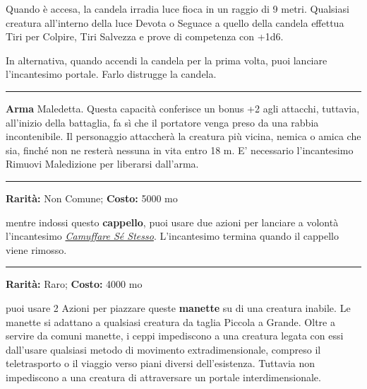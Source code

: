 \begin{multicols}{2}
Quando è accesa, la candela irradia luce fioca in un raggio di 9 metri. Qualsiasi creatura all'interno della luce Devota o Seguace a quello della candela effettua Tiri per Colpire, Tiri Salvezza e prove di competenza con +1d6.

In alternativa, quando accendi la candela per la prima volta, puoi lanciare l'incantesimo portale. Farlo distrugge la candela.

\smallskip\noindent\rule{\linewidth}{2pt}  \hypertarget{Caos}{}\medskip{}\noindent\label{Caos}

\textbf{Arma} Maledetta. Questa capacità conferisce un bonus +2 agli attacchi, tuttavia, all'inizio della battaglia, fa sì che il portatore venga preso da una rabbia incontenibile. Il personaggio attaccherà la creatura più vicina, nemica o amica che sia, finché non ne resterà nessuna in vita entro 18 m. E' necessario l'incantesimo Rimuovi Maledizione per liberarsi dall'arma.

\smallskip\noindent\rule{\linewidth}{2pt}  \hypertarget{CappellodelCamuffamento}{}\medskip{}\noindent\label{CappellodelCamuffamento}

\textbf{Rarità:} Non Comune; \textbf{Costo:} 5000 mo

mentre indossi questo \textbf{cappello}, puoi usare due azioni per lanciare a volontà l'incantesimo \emph{\hyperlink{Camuffare Sé Stesso}{Camuffare Sé Stesso}}. L'incantesimo termina quando il cappello viene rimosso.

\smallskip\noindent\rule{\linewidth}{2pt}  \hypertarget{CeppiDimensionali}{}\medskip{}\noindent\label{CeppiDimensionali}

\textbf{Rarità:} Raro; \textbf{Costo:} 4000 mo

puoi usare 2 Azioni per piazzare queste \textbf{manette} su di una creatura inabile. Le manette si adattano a qualsiasi creatura da taglia Piccola a Grande. Oltre a servire da comuni manette, i ceppi impediscono a una creatura legata con essi dall'usare qualsiasi metodo di movimento extradimensionale, compreso il teletrasporto o il viaggio verso piani diversi dell'esistenza. Tuttavia non impediscono a una creatura di attraversare un portale interdimensionale.


\end{multicols}
